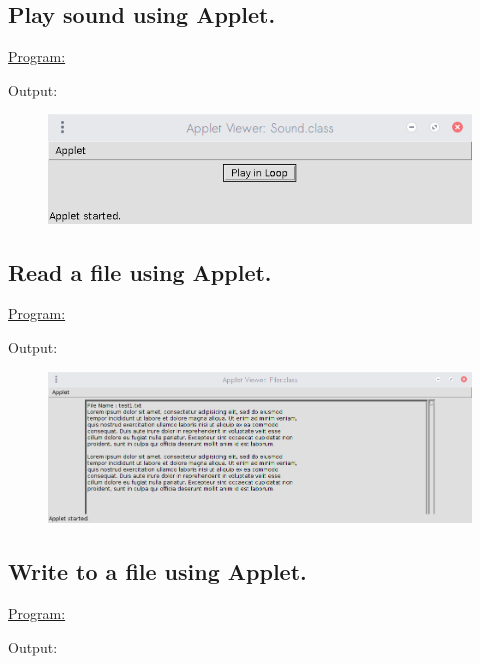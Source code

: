 \documentclass[a4paper,11pt]{article}
\begin{document}
\bigskip

\subsection{Play sound using Applet.}
\underline{Program:}


Output:
\begin{figure}[H]
\centering
\includegraphics[width=350pt,height=\textheight,keepaspectratio]{../assign2/pics/9.png}
\end{figure}

\bigskip

\subsection{Read a file using Applet.}
\underline{Program:}



Output:
\begin{figure}[H]
\centering
\includegraphics[width=350pt,height=\textheight,keepaspectratio]{../assign2/pics/10.png}
\end{figure}

\bigskip

\subsection{Write to a file using Applet.}
\underline{Program:}


Output:
\begin{figure}[H]
\centering
\end{figure}

\bigskip
\end{document}
